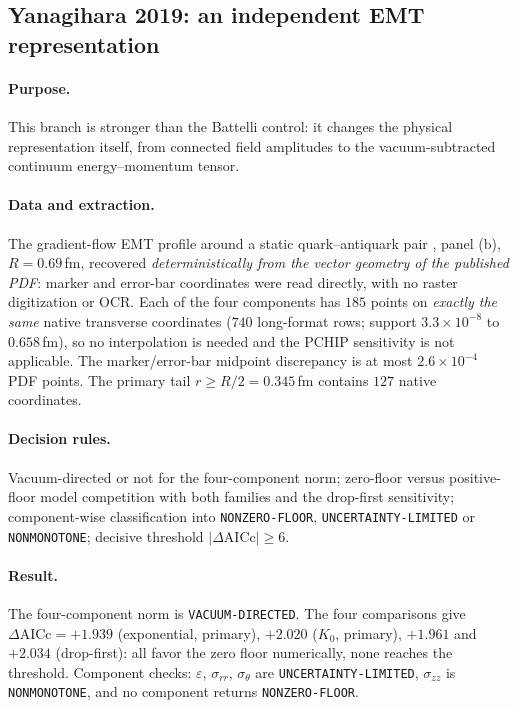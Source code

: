\documentclass[11pt,a4paper]{article}
\theoremstyle{definition}
\theoremstyle{remark}
\begin{document}
\subsection{Yanagihara 2019: an independent EMT representation}\label{ssec:emt}
\paragraph{Purpose.} This branch is stronger than the Battelli control: it changes the physical representation itself, from connected field amplitudes to the vacuum-subtracted continuum energy--momentum tensor.
\paragraph{Data and extraction.} The gradient-flow EMT profile around a static quark--antiquark pair \cite{Yanagihara19}, panel (b), $R=0.69$\,fm, recovered \emph{deterministically from the vector geometry of the published PDF}: marker and error-bar coordinates were read directly, with no raster digitization or OCR. Each of the four components has $185$ points on \emph{exactly the same} native transverse coordinates ($740$ long-format rows; support $3.3\times10^{-8}$ to $0.658$\,fm), so no interpolation is needed and the PCHIP sensitivity is not applicable. The marker/error-bar midpoint discrepancy is at most $2.6\times10^{-4}$ PDF points. The primary tail $r\ge R/2=0.345$\,fm contains $127$ native coordinates.
\paragraph{Decision rules.} Vacuum-directed or not for the four-component norm; zero-floor versus positive-floor model competition with both families and the drop-first sensitivity; component-wise classification into \texttt{NONZERO-\allowbreak{}FLOOR}, \texttt{UNCERTAINTY-\allowbreak{}LIMITED} or \texttt{NONMONOTONE}; decisive threshold $|\Delta\mathrm{AICc}|\ge6$.
\paragraph{Result.} The four-component norm is \texttt{VACUUM-\allowbreak{}DIRECTED}. The four comparisons give $\Delta\mathrm{AICc}=+1.939$ (exponential, primary), $+2.020$ ($K_0$, primary), $+1.961$ and $+2.034$ (drop-first): all favor the zero floor numerically, none reaches the threshold. Component checks: $\varepsilon$, $\sigma_{rr}$, $\sigma_\theta$ are \texttt{UNCERTAINTY-\allowbreak{}LIMITED}, $\sigma_{zz}$ is \texttt{NONMONOTONE}, and no component returns \texttt{NONZERO-\allowbreak{}FLOOR}.
\end{document}
